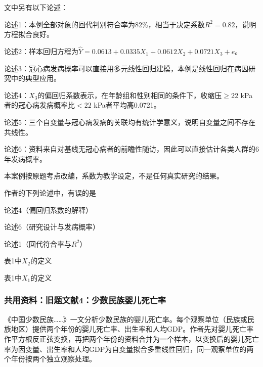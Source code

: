 文中另有以下论述：

论述1：本例全部对象的回代判别符合率为82\%，相当于决定系数\(R^2=0.82\)，说明方程拟合良好。

论述2：样本回归方程为\(\hat Y=0.0613+0.0335X_1+0.0612X_2+0.0721X_3+e\)。

论述3：冠心病发病概率可以直接用多元线性回归建模，本例是线性回归在病因研究中的典型应用。

论述4：\(X_3\)的偏回归系数表示，在年龄组和性别相同的条件下，收缩压\(\ge22\) kPa者的冠心病发病概率比\(<22\) kPa者平均高0.0721。

论述5：三个自变量与冠心病发病的关联均有统计学意义，说明自变量之间不存在共线性。

论述6：资料来自对基线无冠心病者的前瞻性随访，因此可以直接估计各类人群的6年发病概率。

本案例按原题考点改编，系数为教学设定，不是任何真实研究的结果。

\par\addvspace{6pt}\noindent\begin{minipage}{\linewidth}


作者的下列论述中，有误的是

\begin{choices}

\item 论述4（偏回归系数的解释）

\item 论述6（研究设计与发病概率）

\item 论述1（回代符合率与\(R^2\)）

\item 表1中\(X_2\)的定义

\item 表1中\(X_1\)的定义

\end{choices}

\end{minipage}\par\vspace{4pt}

\subsubsection*{共用资料：旧题文献4：少数民族婴儿死亡率}

《中国少数民族\ldots\ldots》一文分析少数民族的婴儿死亡率。每个观察单位（民族或民族地区）提供两个年份的婴儿死亡率、出生率和人均GDP。作者先对婴儿死亡率作平方根反正弦变换，再把两个年份的资料合并为一个样本，以变换后的婴儿死亡率为因变量、出生率和人均GDP为自变量拟合多重线性回归，同一观察单位的两个年份按两个独立观察处理。

